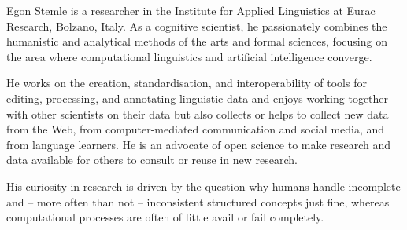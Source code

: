 Egon Stemle is a researcher in the Institute for Applied Linguistics at Eurac Research, Bolzano, Italy.  As a cognitive scientist, he passionately combines the humanistic and analytical methods of the arts and formal sciences, focusing on the area where computational linguistics and artificial intelligence converge.

He works on the creation, standardisation, and interoperability of tools for editing, processing, and annotating linguistic data and enjoys working together with other scientists on their data but also collects or helps to collect new data from the Web, from computer-mediated communication and social media, and from language learners. He is an advocate of open science to make research and data available for others to consult or reuse in new research.

His curiosity in research is driven by the question why humans handle incomplete and -- more often than not -- inconsistent structured concepts just fine, whereas computational processes are often of little avail or fail completely. 

